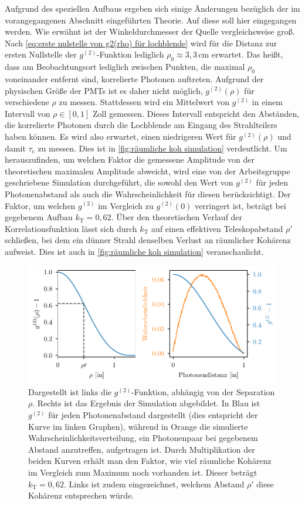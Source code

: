 Aufgrund des speziellen Aufbaus ergeben sich einige Änderungen bezüglich der im vorangegangenen Abschnitt eingeführten Theorie. 
Auf diese soll hier eingegangen werden. 
Wie erwähnt ist der Winkeldurchmesser der Quelle vergleichsweise groß. 
Nach \autoref{eq:erste nulstelle von g2(rho) für lochblende} wird für die Distanz zur ersten Nullstelle der $g^{(2)}$-Funktion lediglich $\rho_0\approx3{,}3\,\mathrm{cm}$ erwartet. 
Das heißt, dass am Beobachtungsort lediglich zwischen Punkten, die maximal $\rho_0$ voneinander entfernt sind, korrelierte Photonen auftreten. 
Aufgrund der physischen Größe der PMTs ist es daher nicht möglich, $g^{(2)}(\rho)$ für verschiedene $\rho$ zu messen. 
Stattdessen wird ein Mittelwert von $g^{(2)}$ in einem Intervall von $\rho\in[0,1]$ Zoll gemessen. 
Dieses Intervall entspricht den Abständen, die korrelierte Photonen durch die Lochblende am Eingang des Strahlteilers haben können. 
Es wird also erwartet, einen niedrigeren Wert für $g^{(2)}(\rho)$ und damit $\tau_{\mathrm{c}}$ zu messen. 
Dies ist in \autoref{fig:räumliche koh simulation} verdeutlicht. 
Um herauszufinden, um welchen Faktor die gemessene Amplitude von der theoretischen maximalen Amplitude abweicht, wird eine von der Arbeitsgruppe geschriebene Simulation durchgeführt, die sowohl den Wert von $g^{(2)}$ für jeden Photonenabstand als auch die Wahrscheinlichkeit für diesen berücksichtigt. 
Der Faktor, um welchen $g^{(2)}$ im Vergleich zu $g^{(2)}(0)$ verringert ist, beträgt bei gegebenem Aufbau $k_\mathrm{T}=0{,}62$. 
Über den theoretischen Verlauf der Korrelationsfunktion lässt sich durch $k_\mathrm{T}$ auf einen effektiven Teleskopabstand $\rho\prime$ schließen, bei dem ein dünner Strahl denselben Verlust an räumlicher Kohärenz aufweist. 
Dies ist auch in \autoref{fig:räumliche koh simulation} veranschaulicht. 
\begin{figure}[ht]
    \centering
    \includegraphics{images/Aufbau/g2(rho).pdf}
    \caption{Dargestellt ist links die $g^{(2)}$-Funktion, abhängig von der Separation $\rho$. Rechts ist das Ergebnis der Simulation abgebildet. In Blau ist $g^{(2)}$ für jeden Photonenabstand dargestellt (dies entspricht der Kurve im linken Graphen), während in Orange die simulierte Wahrscheinlichkeitsverteilung, ein Photonenpaar bei gegebenem Abstand anzutreffen, aufgetragen ist. Durch Multiplikation der beiden Kurven erhält man den Faktor, wie viel räumliche Kohärenz im Vergleich zum Maximum noch vorhanden ist. Dieser beträgt $k_\mathrm{T}=0{,}62$. Links ist zudem eingezeichnet, welchem Abstand $\rho\prime$ diese Kohärenz entsprechen würde. }
    \label{fig:räumliche koh simulation}
\end{figure}

